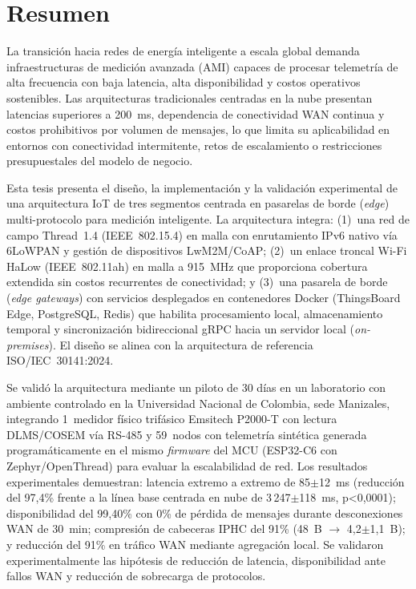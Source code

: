 ﻿\newpage
\thispagestyle{empty}
\chapter*{\sffamily Resumen}
%
\begin{center}
\textbf{\large \thesisname}
\end{center}

\par La transición hacia redes de energía inteligente a escala global demanda infraestructuras de medición avanzada (AMI) capaces de procesar telemetría de alta frecuencia con baja latencia, alta disponibilidad y costos operativos sostenibles. Las arquitecturas tradicionales centradas en la nube presentan latencias superiores a 200~ms, dependencia de conectividad WAN continua y costos prohibitivos por volumen de mensajes, lo que limita su aplicabilidad en entornos con conectividad intermitente, retos de escalamiento o restricciones presupuestales del modelo de negocio.

\par Esta tesis presenta el diseño, la implementación y la validación experimental de una arquitectura IoT de tres segmentos centrada en pasarelas de borde (\emph{edge}) multi-protocolo para medición inteligente. La arquitectura integra: (1)~una red de campo Thread~1.4 (IEEE~802.15.4) en malla con enrutamiento IPv6 nativo vía 6LoWPAN y gestión de dispositivos LwM2M/CoAP; (2)~un enlace troncal Wi-Fi HaLow (IEEE~802.11ah) en malla a 915~MHz que proporciona cobertura extendida sin costos recurrentes de conectividad; y (3)~una pasarela de borde (\emph{edge gateways}) con servicios desplegados en contenedores Docker (ThingsBoard Edge, PostgreSQL, Redis) que habilita procesamiento local, almacenamiento temporal y sincronización bidireccional gRPC hacia un servidor local ({\it on-premises}). El diseño se alinea con la arquitectura de referencia ISO/IEC~30141:2024.

\par Se validó la arquitectura mediante un piloto de 30 días en un laboratorio con ambiente controlado en la Universidad Nacional de Colombia, sede Manizales, integrando 1~medidor físico trifásico Emsitech P2000-T con lectura DLMS/COSEM vía RS-485 y 59~nodos con telemetría sintética generada programáticamente en el mismo \emph{firmware} del MCU (ESP32-C6 con Zephyr/OpenThread) para evaluar la escalabilidad de red. Los resultados experimentales demuestran: latencia extremo a extremo de 85$\pm$12~ms (reducción del 97,4\% frente a la línea base centrada en nube de 3\,247$\pm$118~ms, p<0,0001); disponibilidad del 99,40\% con 0\% de pérdida de mensajes durante desconexiones WAN de 30~min; compresión de cabeceras IPHC del 91\% (48~B $\rightarrow$ 4,2$\pm$1,1~B); y reducción del 91\% en tráfico WAN mediante agregación local. Se validaron experimentalmente las hipótesis de reducción de latencia, disponibilidad ante fallos WAN y reducción de sobrecarga de protocolos.

